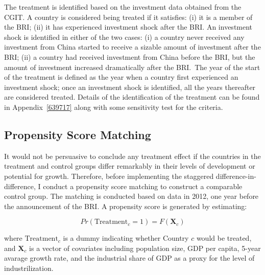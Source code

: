 \documentclass[10pt,a4paper]{article}
\begin{document}
The treatment is identified based on the investment data obtained from
the CGIT. A country is considered being treated if it satisfies: (i) it
is a member of the BRI; (ii) it has experienced investment shock after
the BRI. An investment shock is identified in either of the two cases:
(i) a country never received any investment from China started to
receive a sizable amount of investment after the BRI; (ii) a country had
received investment from China before the BRI, but the amount of
investment increased dramatically after the BRI.~The year of the start
of the treatment is defined as the year when a country first experienced
an investment shock; once an investment shock is identified, all the
years thereafter are considered treated. Details of the identification
of the treatment can be found in
Appendix~{\ref{639717}} along with some sensitivity
test for the criteria.~

\par\null

\subsection{Propensity Score Matching}

{\label{654537}}

It would not be persuasive to conclude any treatment effect if the
countries in the treatment and control groups differ remarkably in their
levels of development or potential for growth. Therefore, before
implementing the staggered difference-in-difference, I conduct a
propensity score matching to construct a comparable control group. The
matching is conducted based on data in 2012, one year before the
announcement of the BRI. A propensity score is generated by estimating:~

$$ Pr(\textrm{Treatment}_c = 1) = F(\mathbf{X}_c) $$

where $\textrm{Treatment}_c$ is a dummy indicating whether Country $c$ would be treated, and $\mathbf{X}_c$ is a vector of covariates including population size, GDP per capita, 5-year avarage growth rate, and the industrial share of GDP as a proxy for the level of industrilization.
\end{document}
